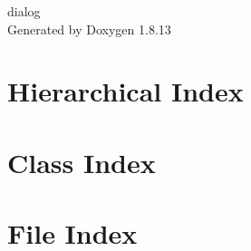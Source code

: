 \documentclass[twoside]{book}
\newcommand{\+}{\discretionary{\mbox{\scriptsize$\hookleftarrow$}}{}{}}
\newcommand{\clearemptydoublepage}{%
  \newpage{\pagestyle{empty}\cleardoublepage}%
}
\begin{document}
\hypersetup{pageanchor=false,
             bookmarksnumbered=true,
             pdfencoding=unicode
            }
\begin{titlepage}
\vspace*{7cm}
\begin{center}%
{\Large dialog }\\
\vspace*{1cm}
{\large Generated by Doxygen 1.8.13}\\
\end{center}
\end{titlepage}
\clearemptydoublepage
{}
\tableofcontents
\clearemptydoublepage
{}
\hypersetup{pageanchor=true}

\chapter{Hierarchical Index}

\chapter{Class Index}

\chapter{File Index}

\end{document}
